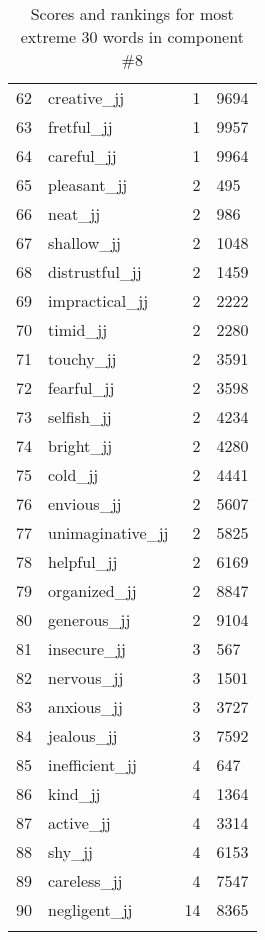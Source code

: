 \begin{longtable}[!htbp]{| rlr@{.}l |}
    62 & creative\_jj & 1 & 9694 \\
    63 & fretful\_jj & 1 & 9957 \\
    64 & careful\_jj & 1 & 9964 \\
    65 & pleasant\_jj & 2 & 495 \\
    66 & neat\_jj & 2 & 986 \\
    67 & shallow\_jj & 2 & 1048 \\
    68 & distrustful\_jj & 2 & 1459 \\
    69 & impractical\_jj & 2 & 2222 \\
    70 & timid\_jj & 2 & 2280 \\
    71 & touchy\_jj & 2 & 3591 \\
    72 & fearful\_jj & 2 & 3598 \\
    73 & selfish\_jj & 2 & 4234 \\
    74 & bright\_jj & 2 & 4280 \\
    75 & cold\_jj & 2 & 4441 \\
    76 & envious\_jj & 2 & 5607 \\
    77 & unimaginative\_jj & 2 & 5825 \\
    78 & helpful\_jj & 2 & 6169 \\
    79 & organized\_jj & 2 & 8847 \\
    80 & generous\_jj & 2 & 9104 \\
    81 & insecure\_jj & 3 & 567 \\
    82 & nervous\_jj & 3 & 1501 \\
    83 & anxious\_jj & 3 & 3727 \\
    84 & jealous\_jj & 3 & 7592 \\
    85 & inefficient\_jj & 4 & 647 \\
    86 & kind\_jj & 4 & 1364 \\
    87 & active\_jj & 4 & 3314 \\
    88 & shy\_jj & 4 & 6153 \\
    89 & careless\_jj & 4 & 7547 \\
    90 & negligent\_jj & 14 & 8365 \\
    \hline
    \caption{Scores and rankings for most extreme 30 words in component \#8} \\
\end{longtable}
